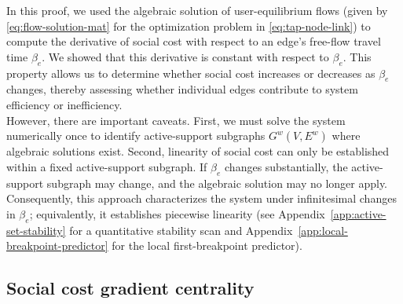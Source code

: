 \documentclass[twocolumn,english,groupedaddress, superscriptaddress,aps,pre,10pt,floatfix]{revtex4-2}
\newcommand{\matr}[1]{{\boldsymbol{#1}}}
\renewcommand{\vec}[1]{{\boldsymbol{#1}}}
\begin{document}


In this proof, we used the algebraic solution of user-equilibrium flows (given by \cref{eq:flow-solution-mat} for the optimization problem in \cref{eq:tap-node-link}) to compute the derivative of social cost with respect to an edge's free-flow travel time $\beta_e$. We showed that this derivative is constant with respect to $\beta_e$. This property allows us to determine whether social cost increases or decreases as $\beta_e$ changes, thereby assessing whether individual edges contribute to system efficiency or inefficiency.\\

However, there are important caveats. First, we must solve the system numerically once to identify active-support subgraphs $G^w(V,E^w)$ where algebraic solutions exist. Second, linearity of social cost can only be established within a fixed active-support subgraph. If $\beta_e$ changes substantially, the active-support subgraph may change, and the algebraic solution may no longer apply. Consequently, this approach characterizes the system under infinitesimal changes in $\beta_e$; equivalently, it establishes piecewise linearity (see Appendix~\ref{app:active-set-stability} for a quantitative stability scan and Appendix~\ref{app:local-breakpoint-predictor} for the local first-breakpoint predictor).


\subsection{Social cost gradient centrality}\label{sec:scgc}
\end{document}
